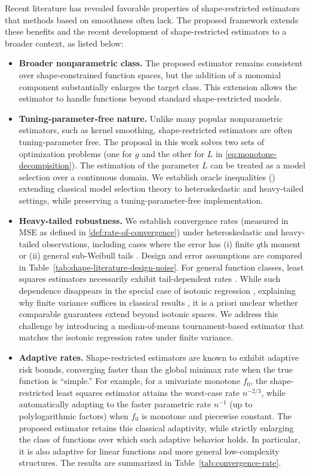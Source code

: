 \documentclass[12pt]{article}
\begin{document}
Recent literature has revealed favorable properties of shape-restricted estimators that methods based on smoothness often lack. The proposed framework extends these benefits and the recent development of shape-restricted estimators to a broader context, as listed below:
\begin{itemize}
    \item \textbf{Broader nonparametric class.} 
The proposed estimator remains consistent over shape-constrained function spaces, but the addition of a monomial component substantially enlarges the target class. This extension allows the estimator to handle functions beyond standard shape-restricted models.
\item \textbf{Tuning-parameter-free nature.} 
Unlike many popular nonparametric estimators, such as kernel smoothing, shape-restricted estimators are often tuning-parameter free. The proposal in this work  solves two sets of optimization problems (one for $g$ and the other for $L$ in \eqref{eq:monotone-decompisition}). The estimation of the parameter $L$ can be treated as a model selection over a continuous domain. We establish oracle inequalities () extending classical model selection theory \citep{massart2000some,gine2003ratio,vaart2006oracle,koltchinskii2011oracle} to heteroskedastic and heavy-tailed settings, while preserving a tuning-parameter-free implementation. 
\item \textbf{Heavy-tailed robustness.}  We establish convergence rates (measured in MSE as defined in \eqref{def:rate-of-convergence}) under heteroskedastic and heavy-tailed observations, including cases where the error has (i) finite $q$th moment or (ii) general sub-Weibull tails \citep{kuchibhotla2022moving}. Design and error assumptions are compared in Table~\ref{tab:shape-literature-design-noise}. For general function classes, least squares estimators necessarily exhibit tail-dependent rates \citep{HanWellner2019}. While such dependence disappears in the special case of isotonic regression \citep{han2018robustness}, explaining why finite variance suffices in classical results \citep{zhang2002risk}, it is a priori unclear whether comparable guarantees extend beyond isotonic spaces. We address this challenge by introducing a median-of-means tournament-based estimator that matches the isotonic regression rates under finite variance.
\item \textbf{Adaptive rates.} Shape-restricted estimators are known to exhibit adaptive risk bounds, converging faster than the global minimax rate when the true function is ``simple.''  For example, for a univariate monotone $f_0$, the shape-restricted least squares estimator attains the worst-case rate $n^{-2/3}$, while automatically adapting to the faster parametric rate $n^{-1}$ (up to polylogarithmic factors) when $f_0$ is monotone and piecewise constant. The proposed estimator retains this classical adaptivity, while strictly enlarging the class of functions over which such adaptive behavior holds. In particular, it is also adaptive for linear functions and more general low-complexity structures. The results are summarized in Table~\ref{tab:convergence-rate}.

\end{itemize}
\end{document}
